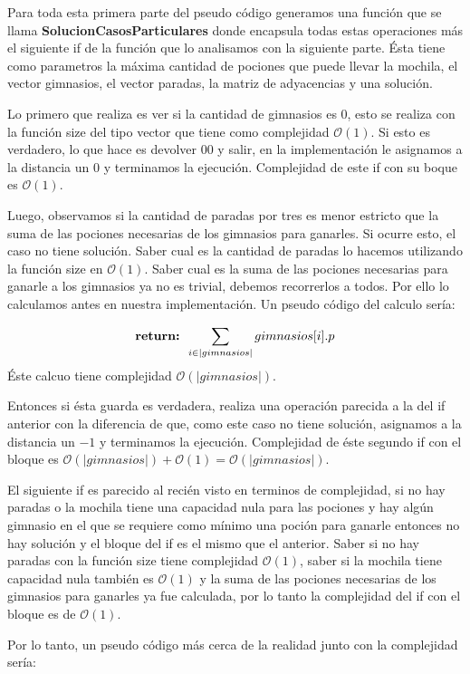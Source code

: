 Para toda esta primera parte del pseudo código generamos una función que se llama \textbf{SolucionCasosParticulares} donde encapsula todas estas operaciones más el siguiente if de la función que lo analisamos con la siguiente parte. Ésta tiene como parametros la máxima cantidad de pociones que puede llevar la mochila, el vector gimnasios, el vector paradas, la matriz de adyacencias y una solución.

Lo primero que realiza es ver si la cantidad de gimnasios es $0$, esto se realiza con la función size del tipo vector que tiene como complejidad $\mathcal{O}(1)$. Si esto es verdadero, lo que hace es devolver $0 0$ y salir, en la implementación le asignamos a la distancia un $0$ y terminamos la ejecución. Complejidad de este if con su boque es $\mathcal{O}(1)$.

Luego, observamos si la cantidad de paradas por tres es menor estricto que la suma de las pociones necesarias de los gimnasios para ganarles. Si ocurre esto, el caso no tiene solución. Saber cual es la cantidad de paradas lo hacemos utilizando la función size en $\mathcal{O}(1)$. Saber cual es la suma de las pociones necesarias para ganarle a los gimnasios ya no es trivial, debemos recorrerlos a todos. Por ello lo calculamos antes en nuestra implementación. Un pseudo código del calculo sería:

\[
	\text{\textbf{return: }} \sum_{i \in |gimnasios|} gimnasios[i].p
\]
Éste calcuo tiene complejidad $\mathcal{O}(|gimnasios|)$.

Entonces si ésta guarda es verdadera, realiza una operación parecida a la del if anterior con la diferencia de que, como este caso no tiene solución, asignamos a la distancia un $-1$ y terminamos la ejecución. Complejidad de éste segundo if con el bloque es $\mathcal{O}(|gimnasios|) + \mathcal{O}(1) = \mathcal{O}(|gimnasios|)$.

El siguiente if es parecido al recién visto en terminos de complejidad, si no hay paradas o la mochila tiene una capacidad nula para las pociones y hay algún gimnasio en el que se requiere como mínimo una poción para ganarle entonces no hay solución y el bloque del if es el mismo que el anterior. Saber si no hay paradas con la función size tiene complejidad $\mathcal{O}(1)$, saber si la mochila tiene capacidad nula también es $\mathcal{O}(1)$ y la suma de las pociones necesarias de los gimnasios para ganarles ya fue calculada, por lo tanto la complejidad del if con el bloque es de $\mathcal{O}(1)$.

Por lo tanto, un pseudo código  más cerca de la realidad junto con la complejidad sería:

